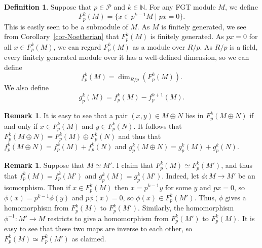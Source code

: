 \documentclass{amsart}
\newcommand{\st}        {\;|\;}
\newcommand{\CP}        {{\mathcal{P}}}
\newcommand{\N}         {{\mathbb{N}}}
\newcommand{\op}        {\oplus}
\newcommand{\xra}       {\xrightarrow}
\renewcommand{\:}{\colon}
\theoremstyle{definition}
\newtheorem{remark}[theorem]{Remark}
\newtheorem{definition}[theorem]{Definition}
\begin{document}
\begin{definition}\label{defn-f-p-k}
 Suppose that $p\in\CP$ and $k\in\N$.  For any FGT module $M$, we
 define
 \[ F_p^k(M) = \{ x \in p^{k-1}M \st px=0 \}. \]
 This is easily seen to be a submodule of $M$.  As $M$ is finitely
 generated, we see from Corollary~\ref{cor-Noetherian} that $F_p^k(M)$
 is finitely generated.  As $px=0$ for all $x\in F_p^k(M)$, we can
 regard $F_p^k(M)$ as a module over $R/p$.  As $R/p$ is a field, every
 finitely generated module over it has a well-defined dimension, so we
 can define
 \[ f_p^k(M) = \dim_{R/p}(F_p^k(M)). \]
 We also define
 \[ g_p^k(M) = f_p^k(M) - f_p^{k+1}(M). \]
\end{definition}
\begin{remark}
 It is easy to see that a pair $(x,y)\in M\op N$ lies in
 $F_p^k(M\op N)$ if and only if $x\in F_p^k(M)$ and $y\in F_p^k(N)$.
 It follows that $F_p^k(M\op N)=F_p^k(M)\op F_p^k(N)$ and thus that
 $f_p^k(M\op N)=f_p^k(M)+f_p^k(N)$ and
 $g_p^k(M\op N)=g_p^k(M)+g_p^k(N)$.
\end{remark}
\begin{remark}
 Suppose that $M\simeq M'$.  I claim that $F_p^k(M)\simeq F_p^k(M')$,
 and thus that $f_p^k(M)=f_p^k(M')$ and $g_p^k(M)=g_p^k(M')$.  Indeed,
 let $\phi\:M\xra{}M'$ be an isomorphism.  Then if $x\in F_p^k(M)$
 then $x=p^{k-1}y$ for some $y$ and $px=0$, so
 $\phi(x)=p^{k-1}\phi(y)$ and $p\phi(x)=0$, so $\phi(x)\in F_p^k(M')$.
 Thus, $\phi$ gives a homomorphism from $F_p^k(M)$ to $F_p^k(M')$.
 Similarly, the homomorphism $\phi^{-1}\:M'\xra{}M$ restricts to give
 a homomorphism from $F_p^k(M')$ to $F_p^k(M)$.  It is easy to see
 that these two maps are inverse to each other, so
 $F_p^k(M)\simeq F_p^k(M')$ as claimed.
\end{remark}
\end{document}
